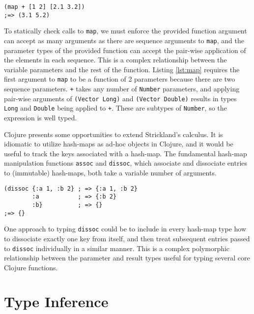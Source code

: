 \begin{lstlisting}[caption=An application of the non-uniform variable-arity function \lstinline|map|, label=lst:map]
(map + [1 2] [2.1 3.2]) 
;=> (3.1 5.2)
\end{lstlisting}

To statically check calls to \lstinline|map|, we must enforce the provided function argument can accept as many
arguments as there are sequence arguments to \lstinline|map|, and the parameter types of the provided function can accept
the pair-wise application of the elements in each sequence. This is a complex relationship between the variable parameters and
the rest of the function.
Listing \ref{lst:map} requires the first argument to \lstinline|map| to be a function of 2 parameters because
there are two sequence parameters. \lstinline|+| takes any number of \lstinline|Number| parameters, 
and applying pair-wise arguments of \lstinline|(Vector Long)| and \lstinline|(Vector Double)| 
results in types \lstinline|Long| and \lstinline|Double| being applied to \lstinline|+|. These are subtypes
of \lstinline|Number|, so the expression is well typed.

Clojure presents some opportunities to extend Strickland's calculus. It is idiomatic
to utilize hash-maps as ad-hoc objects in Clojure, and it would be useful to track the keys associated
with a hash-map.  The fundamental hash-map manipulation functions \lstinline|assoc| and \lstinline|dissoc|,
which associate and dissociate entries to (immutable) hash-maps, both take a variable number of arguments.

\begin{lstlisting}[caption=Using \lstinline|dissoc| with variable arguments, label=lst:assoc1]
(dissoc {:a 1, :b 2} ; => {:a 1, :b 2}
        :a           ; => {:b 2}
        :b}          ; => {}
;=> {}
\end{lstlisting}

One approach to typing \lstinline|dissoc| could be to include in every hash-map type how to dissociate exactly one
key from itself, and then treat subsequent entries passed to \lstinline|dissoc| individually in a similar manner.
This is a complex polymorphic relationship between the parameter and result types useful for typing
several core Clojure functions.

\section{Type Inference}

